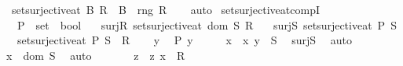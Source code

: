 \begin{isabellebody}
\ \ {\isachardoublequoteopen}set{\isacharunderscore}{\kern0pt}surjective{\isacharunderscore}{\kern0pt}at\ B\ R\ {\isasymLongrightarrow}\ B\ {\isasymsubseteq}\ rng\ R{\isachardoublequoteclose}\isanewline
%
\isadelimproof
\ \ %
\endisadelimproof
%
\isatagproof
{}\isamarkupfalse%
\ auto%
\endisatagproof
{\isafoldproof}%
%
\isadelimproof
\isanewline
%
\endisadelimproof
\isanewline
{}\isamarkupfalse%
\ set{\isacharunderscore}{\kern0pt}surjective{\isacharunderscore}{\kern0pt}at{\isacharunderscore}{\kern0pt}compI{\isacharcolon}{\kern0pt}\isanewline
\ \ \ P\ {\isacharcolon}{\kern0pt}{\isacharcolon}{\kern0pt}\ {\isachardoublequoteopen}set\ {\isasymRightarrow}\ bool{\isachardoublequoteclose}\isanewline
\ \ \ surj{\isacharunderscore}{\kern0pt}R{\isacharcolon}{\kern0pt}\ {\isachardoublequoteopen}set{\isacharunderscore}{\kern0pt}surjective{\isacharunderscore}{\kern0pt}at\ {\isacharparenleft}{\kern0pt}dom\ S{\isacharparenright}{\kern0pt}\ R{\isachardoublequoteclose}\isanewline
\ \ \ surj{\isacharunderscore}{\kern0pt}S{\isacharcolon}{\kern0pt}\ {\isachardoublequoteopen}set{\isacharunderscore}{\kern0pt}surjective{\isacharunderscore}{\kern0pt}at\ P\ S{\isachardoublequoteclose}\isanewline
\ \ \ {\isachardoublequoteopen}set{\isacharunderscore}{\kern0pt}surjective{\isacharunderscore}{\kern0pt}at\ P\ {\isacharparenleft}{\kern0pt}S\ {\isasymcirc}\ R{\isacharparenright}{\kern0pt}{\isachardoublequoteclose}\isanewline
%
\isadelimproof
%
\endisadelimproof
%
\isatagproof
{}\isamarkupfalse%
\isanewline
\ \ \isamarkupfalse%
\ y\ \isamarkupfalse%
\ {\isachardoublequoteopen}P\ y{\isachardoublequoteclose}\isanewline
\ \ \isamarkupfalse%
\ \isamarkupfalse%
\ x\ \ {\isachardoublequoteopen}{\isasymlangle}x{\isacharcomma}{\kern0pt}\ y{\isasymrangle}\ {\isasymin}\ S{\isachardoublequoteclose}\ \isamarkupfalse%
\ surj{\isacharunderscore}{\kern0pt}S\ \isamarkupfalse%
\ auto\isanewline
\ \ \isamarkupfalse%
\ \isamarkupfalse%
\ \isamarkupfalse%
\ {\isachardoublequoteopen}x\ {\isasymin}\ dom\ S{\isachardoublequoteclose}\ \isamarkupfalse%
\ auto\isanewline
\ \ \isamarkupfalse%
\ \isamarkupfalse%
\ \isamarkupfalse%
\ z\ \ {\isachardoublequoteopen}{\isasymlangle}z{\isacharcomma}{\kern0pt}\ x{\isasymrangle}\ {\isasymin}\ R{\isachardoublequoteclose}\ \isamarkupfalse%

\end{isabellebody}
